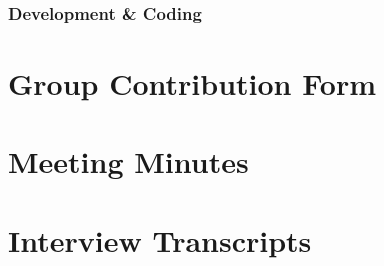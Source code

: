 \documentclass[12pt,a4paper]{article}
\begin{document}
\subsubsection{Development & Coding}

\section{Group Contribution Form}

\section{Meeting Minutes}

\section{Interview Transcripts}
\end{document}
